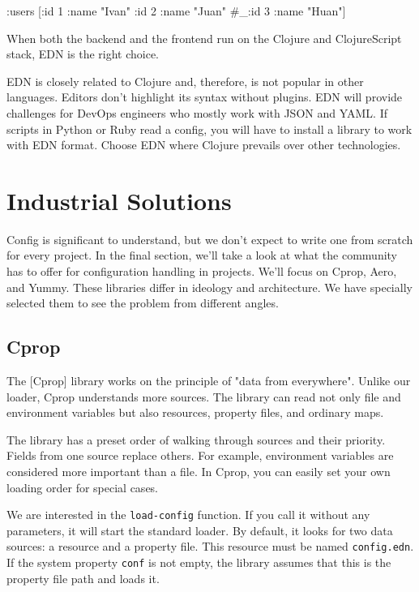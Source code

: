 \begin{clojure}
{:users [{:id 1 :name "Ivan"}
         {:id 2 :name "Juan"}
         #_{:id 3 :name "Huan"}]}
\end{clojure}

When both the backend and the frontend run on the Clojure and ClojureScript stack, EDN is the right choice.

EDN is closely related to Clojure and, therefore, is not popular in other languages. Editors don't highlight its syntax without plugins. EDN will provide challenges for DevOps engineers who mostly work with JSON and YAML. If scripts in Python or Ruby read a config, you will have to install a library to work with EDN format. Choose EDN where Clojure prevails over other technologies.

\section{Industrial Solutions}

Config is significant to understand, but we don't expect to write one from scratch for every project. In the final section, we'll take a look at what the community has to offer for configuration handling in projects. We'll focus on Cprop, Aero, and Yummy. These libraries differ in ideology and architecture. We have specially selected them to see the problem from different angles.

\subsection{Cprop}


The [Cprop] library works on the principle of "data from everywhere". Unlike our loader, Cprop understands more sources. The library can read not only file and environment variables but also resources, property files, and ordinary maps.

The library has a preset order of walking through sources and their priority. Fields from one source replace others. For example, environment variables are considered more important than a file. In Cprop, you can easily set your own loading order for special cases.

We are interested in the \verb|load-config| function. If you call it without any parameters, it will start the standard loader. By default, it looks for two data sources: a resource and a property file. This resource must be named \verb|config.edn|. If the system property \verb|conf| is not empty, the library assumes that this is the property file path and loads it.

